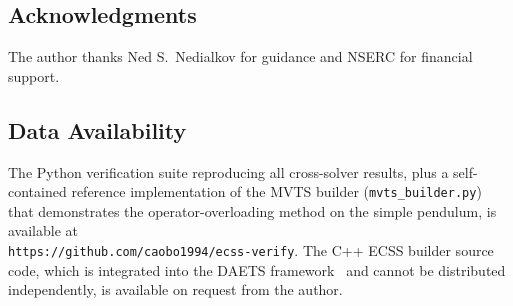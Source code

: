\documentclass[12pt,a4paper]{article}
\theoremstyle{definition}
\theoremstyle{plain}
\theoremstyle{remark}
\begin{document}
\subsection*{Acknowledgments}
The author thanks Ned S.\ Nedialkov for guidance and NSERC for financial support.

\subsection*{Data Availability}
The Python verification suite reproducing all cross-solver results, plus a self-contained reference implementation of the MVTS builder (\texttt{mvts\_builder.py}) that demonstrates the operator-overloading method on the simple pendulum, is available at\\ \texttt{https://github.com/caobo1994/ecss-verify}. The C++ ECSS builder source code, which is integrated into the DAETS framework~\cite{nedialkov2008solving} and cannot be distributed independently, is available on request from the author.
\end{document}
